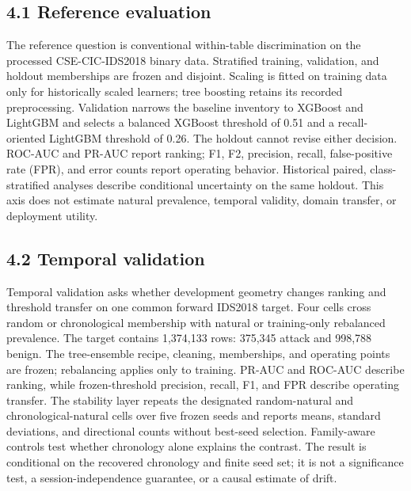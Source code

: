 \documentclass[preprint,12pt]{elsarticle}
\begin{document}
\subsection{4.1 Reference evaluation}
The reference question is conventional within-table discrimination on the processed CSE-CIC-IDS2018 binary data. Stratified training, validation, and holdout memberships are frozen and disjoint. Scaling is fitted on training data only for historically scaled learners; tree boosting retains its recorded preprocessing. Validation narrows the baseline inventory to XGBoost and LightGBM and selects a balanced XGBoost threshold of 0.51 and a recall-oriented LightGBM threshold of 0.26. The holdout cannot revise either decision. ROC-AUC and PR-AUC report ranking; F1, F2, precision, recall, false-positive rate (FPR), and error counts report operating behavior. Historical paired, class-stratified analyses describe conditional uncertainty on the same holdout. This axis does not estimate natural prevalence, temporal validity, domain transfer, or deployment utility.

\subsection{4.2 Temporal validation}
Temporal validation asks whether development geometry changes ranking and threshold transfer on one common forward IDS2018 target. Four cells cross random or chronological membership with natural or training-only rebalanced prevalence. The target contains 1,374,133 rows: 375,345 attack and 998,788 benign. The tree-ensemble recipe, cleaning, memberships, and operating points are frozen; rebalancing applies only to training.
PR-AUC and ROC-AUC describe ranking, while frozen-threshold precision, recall, F1, and FPR describe operating transfer. The stability layer repeats the designated random-natural and chronological-natural cells over five frozen seeds and reports means, standard deviations, and directional counts without best-seed selection. Family-aware controls test whether chronology alone explains the contrast. The result is conditional on the recovered chronology and finite seed set; it is not a significance test, a session-independence guarantee, or a causal estimate of drift.
\end{document}
